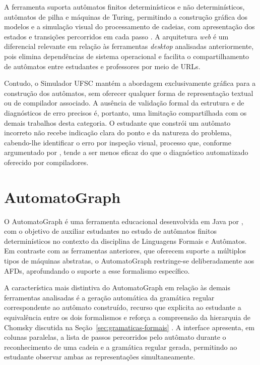 \documentclass[
    12pt
    ,oneside
    ,a4paper
    ,chapter=TITLE
    ,section=TITLE
    ,sumario=abnt-6027-2012]{abntex2}
\begin{document}
A ferramenta suporta autômatos finitos determinísticos e não determinísticos, autômatos de
pilha e máquinas de Turing, permitindo a construção gráfica dos modelos e a simulação visual
do processamento de cadeias, com apresentação dos estados e transições percorridos em cada
passo \cite{nunes2017simulador}. A arquitetura \textit{web} é um diferencial relevante em
relação às ferramentas \textit{desktop} analisadas anteriormente, pois elimina dependências de
sistema operacional e facilita o compartilhamento de autômatos entre estudantes e professores
por meio de URLs.

Contudo, o Simulador UFSC mantém a abordagem exclusivamente gráfica para a construção dos
autômatos, sem oferecer qualquer forma de representação textual ou de compilador associado. A
ausência de validação formal da estrutura e de diagnósticos de erro precisos é, portanto, uma
limitação compartilhada com os demais trabalhos desta categoria. O estudante que constrói um
autômato incorreto não recebe indicação clara do ponto e da natureza do problema, cabendo-lhe
identificar o erro por inspeção visual, processo que, conforme argumentado por
, tende a ser menos eficaz do que o diagnóstico automatizado oferecido
por compiladores.

\section{AutomatoGraph}
\label{sec:rel-automatograph}

O AutomatoGraph é uma ferramenta educacional desenvolvida em Java por
, com o objetivo de auxiliar estudantes no estudo de autômatos
finitos determinísticos no contexto da disciplina de Linguagens Formais e Autômatos. Em
contraste com as ferramentas anteriores, que oferecem suporte a múltiplos tipos de máquinas
abstratas, o AutomatoGraph restringe-se deliberadamente aos AFDs, aprofundando o suporte a esse
formalismo específico.

A característica mais distintiva do AutomatoGraph em relação às demais ferramentas analisadas é
a geração automática da gramática regular correspondente ao autômato construído, recurso que
explicita ao estudante a equivalência entre os dois formalismos e reforça a compreensão da
hierarquia de Chomsky discutida na Seção~\ref{sec:gramaticas-formais}
\cite{kienetz2016automatograph}. A interface apresenta, em colunas paralelas, a lista de passos
percorridos pelo autômato durante o reconhecimento de uma cadeia e a gramática regular gerada,
permitindo ao estudante observar ambas as representações simultaneamente.
\end{document}
